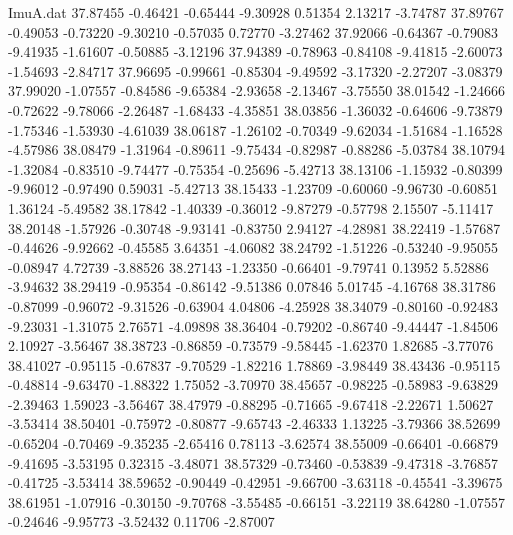 \begin{filecontents}{ImuA.dat}
  37.87455   -0.46421   -0.65444   -9.30928    0.51354    2.13217   -3.74787
  37.89767   -0.49053   -0.73220   -9.30210   -0.57035    0.72770   -3.27462
  37.92066   -0.64367   -0.79083   -9.41935   -1.61607   -0.50885   -3.12196
  37.94389   -0.78963   -0.84108   -9.41815   -2.60073   -1.54693   -2.84717
  37.96695   -0.99661   -0.85304   -9.49592   -3.17320   -2.27207   -3.08379
  37.99020   -1.07557   -0.84586   -9.65384   -2.93658   -2.13467   -3.75550
  38.01542   -1.24666   -0.72622   -9.78066   -2.26487   -1.68433   -4.35851
  38.03856   -1.36032   -0.64606   -9.73879   -1.75346   -1.53930   -4.61039
  38.06187   -1.26102   -0.70349   -9.62034   -1.51684   -1.16528   -4.57986
  38.08479   -1.31964   -0.89611   -9.75434   -0.82987   -0.88286   -5.03784
  38.10794   -1.32084   -0.83510   -9.74477   -0.75354   -0.25696   -5.42713
  38.13106   -1.15932   -0.80399   -9.96012   -0.97490    0.59031   -5.42713
  38.15433   -1.23709   -0.60060   -9.96730   -0.60851    1.36124   -5.49582
  38.17842   -1.40339   -0.36012   -9.87279   -0.57798    2.15507   -5.11417
  38.20148   -1.57926   -0.30748   -9.93141   -0.83750    2.94127   -4.28981
  38.22419   -1.57687   -0.44626   -9.92662   -0.45585    3.64351   -4.06082
  38.24792   -1.51226   -0.53240   -9.95055   -0.08947    4.72739   -3.88526
  38.27143   -1.23350   -0.66401   -9.79741    0.13952    5.52886   -3.94632
  38.29419   -0.95354   -0.86142   -9.51386    0.07846    5.01745   -4.16768
  38.31786   -0.87099   -0.96072   -9.31526   -0.63904    4.04806   -4.25928
  38.34079   -0.80160   -0.92483   -9.23031   -1.31075    2.76571   -4.09898
  38.36404   -0.79202   -0.86740   -9.44447   -1.84506    2.10927   -3.56467
  38.38723   -0.86859   -0.73579   -9.58445   -1.62370    1.82685   -3.77076
  38.41027   -0.95115   -0.67837   -9.70529   -1.82216    1.78869   -3.98449
  38.43436   -0.95115   -0.48814   -9.63470   -1.88322    1.75052   -3.70970
  38.45657   -0.98225   -0.58983   -9.63829   -2.39463    1.59023   -3.56467
  38.47979   -0.88295   -0.71665   -9.67418   -2.22671    1.50627   -3.53414
  38.50401   -0.75972   -0.80877   -9.65743   -2.46333    1.13225   -3.79366
  38.52699   -0.65204   -0.70469   -9.35235   -2.65416    0.78113   -3.62574
  38.55009   -0.66401   -0.66879   -9.41695   -3.53195    0.32315   -3.48071
  38.57329   -0.73460   -0.53839   -9.47318   -3.76857   -0.41725   -3.53414
  38.59652   -0.90449   -0.42951   -9.66700   -3.63118   -0.45541   -3.39675
  38.61951   -1.07916   -0.30150   -9.70768   -3.55485   -0.66151   -3.22119
  38.64280   -1.07557   -0.24646   -9.95773   -3.52432    0.11706   -2.87007

\end{filecontents}
